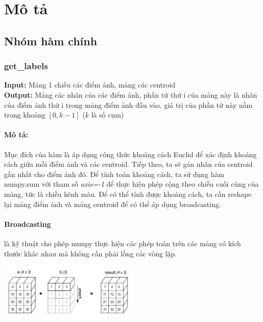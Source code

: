 \documentclass{article}
\begin{document}
\section{Mô tả}

\subsection{Nhóm hàm chính}
\subsubsection{get\_labels}
\textbf{Input:} Mảng 1 chiều các điểm ảnh, mảng các centroid \\
\textbf{Output:} Mảng các nhãn của các điểm ảnh, phần tử thứ i của mảng này là nhãn của điểm ảnh thứ i trong mảng điểm ảnh đầu vào, giá trị của phần tử này nằm trong khoảng $[0, k - 1]$ ($k$ là số cụm)

\paragraph{Mô tả:}
Mục đích của hàm là áp dụng công thức khoảng cách Euclid để xác định khoảng cách
giữa mỗi điểm ảnh và các centroid. Tiếp theo, ta sẽ gán nhãn của centroid gần nhất cho điểm ảnh
đó. Để tính toán khoảng cách, ta sử dụng hàm numpy.sum với tham số \textit{axis=-1} để thực hiện phép cộng theo chiều cuối cùng của mảng, tức là chiều kênh màu. Để có thể tính được khoảng cách, ta cần reshape lại mảng điểm ảnh và mảng centroid để có thể áp dụng broadcasting. 

\paragraph*{Broadcasting}
là kỹ thuật cho phép numpy thực hiện các phép toán trên các mảng có kích thước khác nhau mà không cần phải lồng các vòng lặp. 

\includegraphics[width=0.5\textwidth]{image/broadcasting_2.png}
\end{document}

